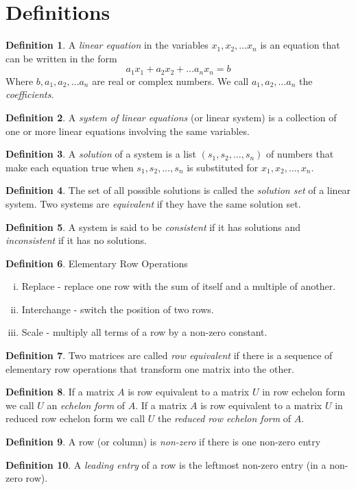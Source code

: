 \documentclass[12pt,letterpaper]{article}
\newcommand{\0}{{\bf 0}}
\theoremstyle{plain}
\theoremstyle{definition}
\newtheorem{definition}{Definition}
\begin{document}
\section{Definitions}
\begin{definition}
A \emph{linear equation}  in the variables $x_1,x_2,\ldots x_n$ is an equation that can be written in the form 
\[a_1x_1+a_2x_2+\ldots a_nx_n=b\]
Where $b, a_1, a_2, \ldots a_n$ are real or complex numbers. We call $a_1, a_2, \ldots a_n$ the \emph{coefficients}.
\end{definition}
\begin{definition}
 A \emph{system of linear equations} (or linear system) is a collection of one or more linear equations involving the same variables. 
\end{definition}
\begin{definition}
A \emph{solution} of a system is a list $(s_1, s_2, \ldots,  s_n)$ of numbers that make each equation true when $s_1, s_2, \ldots, s_n$ is substituted for $x_1, x_2, \ldots, x_n$. 
\end{definition}
\begin{definition}
The set of all possible solutions is called the \emph{solution set} of a linear system. Two systems are \emph{equivalent} if they have the same solution set. 
\end{definition}
\begin{definition} A system is said to be \emph{consistent} if it has solutions and \emph{inconsistent} if it has no solutions. 
\end{definition}
\begin{definition}
Elementary Row Operations 
\begin{enumerate}[(i)]
\item Replace - replace one row with the sum of itself and a multiple of another. 
\item Interchange - switch the position of two rows. 
\item Scale - multiply all terms of a row by a non-zero constant. 
\end{enumerate}
\end{definition}
\begin{definition}Two matrices are called \emph{row equivalent} if there is a sequence of elementary row operations that transform one matrix into the other. 
\end{definition}
\begin{definition} If a matrix $A$ is row equivalent to a matrix $U$ in row echelon form we call $U$ an \emph{echelon form} of $A$. If a matrix $A$ is row equivalent to a matrix $U$ in reduced row echelon form we call $U$ the \emph{reduced row echelon form} of $A$. 
\end{definition}
\begin{definition}
A row (or column) is \emph{non-zero} if there is one non-zero entry
\end{definition}
\begin{definition}
A \emph{leading entry} of a row is the leftmost non-zero entry (in a non-zero row). 
\end{definition}
\end{document}
